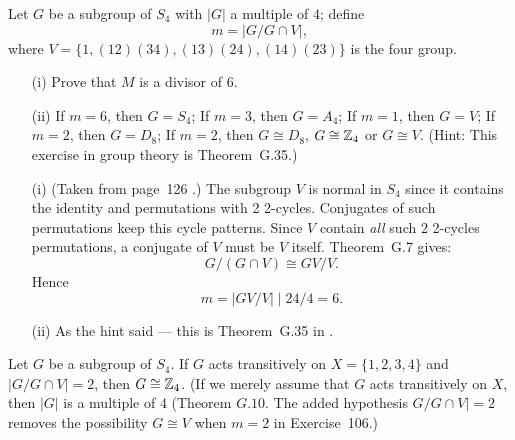 \begin{myenumerate}
\item
\begin{excopy}
Let $G$ be a subgroup of \(S_4\) with \(|G|\) a multiple of $4$; define
\begin{equation*}
 m = |G/G\cap V|,
\end{equation*}
where \(V = \{1,(12)(34),(13)(24),(14)(23)\}\) is the four group.
\begin{itemize}
 \item[(i)] Prove that $M$ is a divisor of $6$.
 \item[(ii)]
   If \(m = 6\), then \(G = S_4\);
   If \(m = 3\), then \(G = A_4\);
   If \(m = 1\), then \(G = V\);
   If \(m = 2\), then \(G = D_8\);
   If \(m = 2\), then \(G \cong D_8\), \(G \cong \mathbb{Z}_4\) or \(G \cong V\).
   (Hint: This exercise in group theory is Theorem~G.35.)
\end{itemize}
\end{excopy}

\begin{itemize}

 \item[(i)]
 (Taken from page~126 \cite{Rotman98}.)
 The subgroup $V$ is normal in \(S_4\) since it contains the identity
 and permutations with 2 2-cycles. Conjugates of such permutations
 keep this cycle patterns. Since $V$ contain \emph{all}
 such 2 2-cycles permutations, a conjugate of $V$ must be $V$ itself.
 Theorem~G.7 \cite{Rotman98} gives:
 \begin{equation*}
  G/(G\cap V) \cong GV/V.
 \end{equation*}
  Hence
 \begin{equation*}
  m = |GV/V| \mid 24/4 = 6.
 \end{equation*}

 \item[(ii)]
  As the hint said --- this is Theorem~G.35 in \cite{Rotman98}.
\end{itemize}

\item
\begin{excopy}
Let \label{ex:Gtrans}
$G$ be a subgroup of \(S_4\). If $G$ acts transitively on
\(X = \{1,2,3,4\}\) and \(|G/G\cap V| = 2\), then \(G \cong \mathbb{Z}_4\).
(If we merely assume that $G$ acts transitively on $X$, then \(|G|\) is
a multiple of $4$ (Theorem \(G.10\).
The added hypothesis \(G/G\cap V| = 2\)  removes the possibility \(G \cong V\)
when \(m = 2\) in Exercise~106.)

\end{excopy}


\end{myenumerate}

